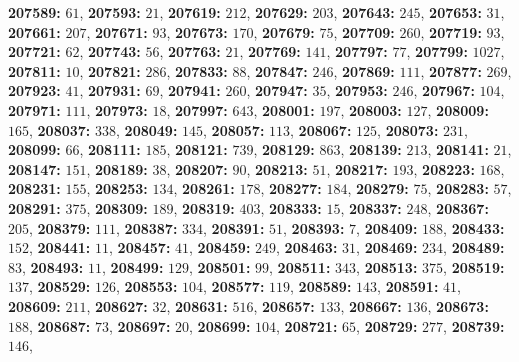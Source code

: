 \textsf{\bfseries 207589:} $61$, \textsf{\bfseries 207593:} $21$, \textsf{\bfseries 207619:} $212$, \textsf{\bfseries 207629:} $203$, \textsf{\bfseries 207643:} $245$, \textsf{\bfseries 207653:} $31$, \textsf{\bfseries 207661:} $207$, \textsf{\bfseries 207671:} $93$, \textsf{\bfseries 207673:} $170$, \textsf{\bfseries 207679:} $75$, \textsf{\bfseries 207709:} $260$, \textsf{\bfseries 207719:} $93$, \textsf{\bfseries 207721:} $62$, \textsf{\bfseries 207743:} $56$, \textsf{\bfseries 207763:} $21$, \textsf{\bfseries 207769:} $141$, \textsf{\bfseries 207797:} $77$, \textsf{\bfseries 207799:} $1027$, \textsf{\bfseries 207811:} $10$, \textsf{\bfseries 207821:} $286$, \textsf{\bfseries 207833:} $88$, \textsf{\bfseries 207847:} $246$, \textsf{\bfseries 207869:} $111$, \textsf{\bfseries 207877:} $269$, \textsf{\bfseries 207923:} $41$, \textsf{\bfseries 207931:} $69$, \textsf{\bfseries 207941:} $260$, \textsf{\bfseries 207947:} $35$, \textsf{\bfseries 207953:} $246$, \textsf{\bfseries 207967:} $104$, \textsf{\bfseries 207971:} $111$, \textsf{\bfseries 207973:} $18$, \textsf{\bfseries 207997:} $643$, \textsf{\bfseries 208001:} $197$, \textsf{\bfseries 208003:} $127$, \textsf{\bfseries 208009:} $165$, \textsf{\bfseries 208037:} $338$, \textsf{\bfseries 208049:} $145$, \textsf{\bfseries 208057:} $113$, \textsf{\bfseries 208067:} $125$, \textsf{\bfseries 208073:} $231$, \textsf{\bfseries 208099:} $66$, \textsf{\bfseries 208111:} $185$, \textsf{\bfseries 208121:} $739$, \textsf{\bfseries 208129:} $863$, \textsf{\bfseries 208139:} $213$, \textsf{\bfseries 208141:} $21$, \textsf{\bfseries 208147:} $151$, \textsf{\bfseries 208189:} $38$, \textsf{\bfseries 208207:} $90$, \textsf{\bfseries 208213:} $51$, \textsf{\bfseries 208217:} $193$, \textsf{\bfseries 208223:} $168$, \textsf{\bfseries 208231:} $155$, \textsf{\bfseries 208253:} $134$, \textsf{\bfseries 208261:} $178$, \textsf{\bfseries 208277:} $184$, \textsf{\bfseries 208279:} $75$, \textsf{\bfseries 208283:} $57$, \textsf{\bfseries 208291:} $375$, \textsf{\bfseries 208309:} $189$, \textsf{\bfseries 208319:} $403$, \textsf{\bfseries 208333:} $15$, \textsf{\bfseries 208337:} $248$, \textsf{\bfseries 208367:} $205$, \textsf{\bfseries 208379:} $111$, \textsf{\bfseries 208387:} $334$, \textsf{\bfseries 208391:} $51$, \textsf{\bfseries 208393:} $7$, \textsf{\bfseries 208409:} $188$, \textsf{\bfseries 208433:} $152$, \textsf{\bfseries 208441:} $11$, \textsf{\bfseries 208457:} $41$, \textsf{\bfseries 208459:} $249$, \textsf{\bfseries 208463:} $31$, \textsf{\bfseries 208469:} $234$, \textsf{\bfseries 208489:} $83$, \textsf{\bfseries 208493:} $11$, \textsf{\bfseries 208499:} $129$, \textsf{\bfseries 208501:} $99$, \textsf{\bfseries 208511:} $343$, \textsf{\bfseries 208513:} $375$, \textsf{\bfseries 208519:} $137$, \textsf{\bfseries 208529:} $126$, \textsf{\bfseries 208553:} $104$, \textsf{\bfseries 208577:} $119$, \textsf{\bfseries 208589:} $143$, \textsf{\bfseries 208591:} $41$, \textsf{\bfseries 208609:} $211$, \textsf{\bfseries 208627:} $32$, \textsf{\bfseries 208631:} $516$, \textsf{\bfseries 208657:} $133$, \textsf{\bfseries 208667:} $136$, \textsf{\bfseries 208673:} $188$, \textsf{\bfseries 208687:} $73$, \textsf{\bfseries 208697:} $20$, \textsf{\bfseries 208699:} $104$, \textsf{\bfseries 208721:} $65$, \textsf{\bfseries 208729:} $277$, \textsf{\bfseries 208739:} $146$, 
